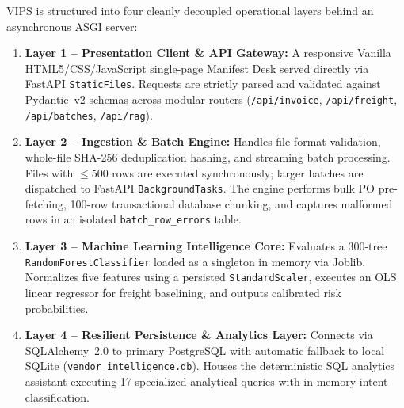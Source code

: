 \documentclass[conference]{IEEEtran}
\begin{document}
VIPS is structured into four cleanly decoupled operational layers behind an asynchronous ASGI server:

\begin{enumerate}
    \item \textbf{Layer 1 -- Presentation Client \& API Gateway:} A responsive Vanilla HTML5/CSS/JavaScript single-page Manifest Desk served directly via FastAPI \texttt{StaticFiles}. Requests are strictly parsed and validated against Pydantic~v2 schemas across modular routers (\texttt{/api/invoice}, \texttt{/api/freight}, \texttt{/api/batches}, \texttt{/api/rag}).
    \item \textbf{Layer 2 -- Ingestion \& Batch Engine:} Handles file format validation, whole-file SHA-256 deduplication hashing, and streaming batch processing. Files with $\le 500$ rows are executed synchronously; larger batches are dispatched to FastAPI \texttt{BackgroundTasks}. The engine performs bulk PO pre-fetching, 100-row transactional database chunking, and captures malformed rows in an isolated \texttt{batch\_row\_errors} table.
    \item \textbf{Layer 3 -- Machine Learning Intelligence Core:} Evaluates a 300-tree \texttt{RandomForestClassifier} loaded as a singleton in memory via Joblib. Normalizes five features using a persisted \texttt{StandardScaler}, executes an OLS linear regressor for freight baselining, and outputs calibrated risk probabilities.
    \item \textbf{Layer 4 -- Resilient Persistence \& Analytics Layer:} Connects via SQLAlchemy~2.0 to primary PostgreSQL with automatic fallback to local SQLite (\texttt{vendor\_intelligence.db}). Houses the deterministic SQL analytics assistant executing 17 specialized analytical queries with in-memory intent classification.
\end{enumerate}
\end{document}
